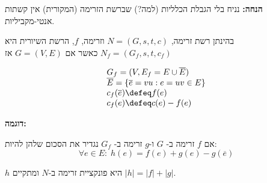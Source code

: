 \textbf{הנחה:}
נניח בלי הגבלת הכלליות (למה?) שברשת הזרימה (המקורית) אין קשתות אנטי-מקביליות.

\begin{definition}
בהינתן רשת זרימה,
$N = (G, s, t, c)$
וזרימה, $f$, הרשת השיורית היא
$N_f = (G_f, s, t, c_f)$
כאשר אם 
$G = (V, E)$ 
אז

$$
\begin{array}{l}
G_f = (V, E_f = E \cup \overline{E})
\\
\overline{E} = \{\overline{e} = vu : e = uv \in E\}
\\
c_f(\overline{e}) \defeq f(e)
\\
c_f(e) \defeq c(e) - f(e)
\\
\end{array}
$$
\end{definition}

\textbf{דוגמה:}

\begin{center}
\end{center}

\begin{definition}
אם $f$ זרימה ב-
$G$
ו-$g$ זרימה ב-
$G_f$
נגדיר את הסכום שלהן להיות:
$$
\forall e \in E: \; h(e) = f(e) + g(e) - g(\overline{e})
$$
\end{definition}

\begin{lemma}
\label{lemma:addition}
$h$
היא פונקציית זרימה ב-$N$
ומתקיים 
$|h| = |f| + |g|$.
\end{lemma}

